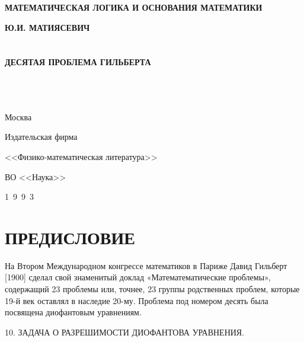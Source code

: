 \documentclass[12pt, a4paper, openany]{book}
\begin{document}
	
	\begin{titlepage}
		
		\begin{center}
				{\Huge\bf МАТЕМАТИЧЕСКАЯ ЛОГИКА И ОСНОВАНИЯ МАТЕМАТИКИ\\}
			\vspace*{\fill}
			
			
			{\large\bf Ю.И. МАТИЯСЕВИЧ\\}
			\ \\
			\ \\
			{\Huge\bf ДЕСЯТАЯ ПРОБЛЕМА ГИЛЬБЕРТА\\}
			\ \\
			\ \\
			\ \\
			\vspace*{\fill}
			
			\vfill
			
				\begin{flushleft}
			
			Москва
		
			Издательская фирма
			
			<<Физико-математическая литература>>
			
			ВО <<Наука>>
			
			1\ 9\ 9\ 3
			
		\end{flushleft}
		\end{center}
		
	\end{titlepage}
	
	\thispagestyle{empty} %
	
	\newpage
	

\setcounter{secnumdepth}{0}
	
	\section[ПРЕДИСЛОВИЕ]{\center \textbf{ПРЕДИСЛОВИЕ}}
	
На Втором Международном конгрессе математиков в Париже Давид Гильберт [1900] сделал свой знаменитый доклад «Математематические проблемы», содержащий 23 проблемы или, точнее, 23 группы родственных проблем, которые 19-й век оставлял в  наследие 20-му. Проблема под номером десять была посвящена  диофантовым уравнениям. 


	\begin{center}
	10. ЗАДАЧА О РАЗРЕШИМОСТИ ДИОФАНТОВА УРАВНЕНИЯ. 
\end{center}
\end{document}
